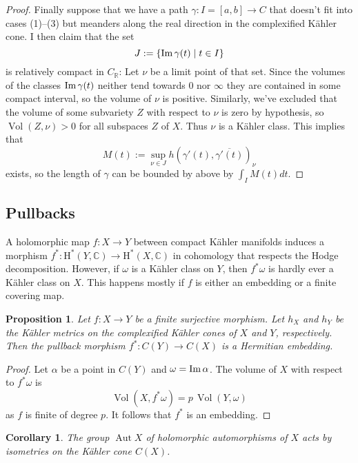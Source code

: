 \documentclass[11pt,a4paper]{amsart}
\newtheorem{prop}[theo]{Proposition}
\newtheorem{coro}[theo]{Corollary}
\theoremstyle{definition}
\theoremstyle{remark}
\newcommand{\RR}{\mathbb{R}}
\newcommand{\CC}{\mathbb{C}}
\newcommand{\Aut}{\mathop{\mathrm{Aut}}}
\newcommand{\Vol}{\mathop{\mathrm{Vol}}}
\def\Im{\mathop{\rm Im}}
\def\ov#1{\overline{#1}}
\def\coho#1{\mathrm{H}^{#1}}
\def\kf{\omega}
\def\ckf{\alpha}
\def\KC{C}
\begin{document}
\begin{proof}
Finally suppose that we have a path $\gamma : I = [a,b] \to C$ that
doesn't fit into cases (1)--(3) but meanders along the real direction in
the complexified K\"{a}hler cone. I then claim that the set
$$
J := \{ \Im \gamma(t) \mid t \in I \}
$$
is relatively compact in $C_{\RR}$: Let $\nu$ be a limit point of that
set. Since the volumes of the classes $\Im \gamma(t)$ neither tend
towards $0$ nor $\infty$ they are contained in some compact interval, so
the volume of $\nu$ is positive. Similarly, we've excluded that the
volume of some subvariety $Z$ with respect to $\nu$ is zero by
hypothesis, so $\Vol(Z,\nu) > 0$ for all subspaces $Z$ of $X$. Thus
$\nu$ is a K\"{a}hler class. 
This implies that
$$
M(t) := \sup_{\nu \in J} h(\gamma'(t),\ov{\gamma'(t)})_{\nu}
$$
exists, so the length of $\gamma$ can be bounded by above by
$\int_I M(t) dt$.
\end{proof}

\subsection{Pullbacks}

A holomorphic map $f : X \to Y$ between compact K\"{a}hler manifolds induces
a morphism $f^* : \coho{*}(Y,\CC) \to \coho{*}(X,\CC)$ in cohomology
that respects the Hodge decomposition. However, if $\kf$ is a K\"{a}hler
class on $Y$, then $f^*\kf$ is hardly ever a K\"{a}hler class on $X$. This
happens mostly if $f$ is either an embedding or a finite covering map.

\begin{prop}
Let $f : X \to Y$ be a finite surjective morphism. Let $h_X$ and $h_Y$
be the K\"{a}hler metrics on the complexified K\"{a}hler cones of $X$ and
$Y$, respectively. Then the pullback morphism $f^* : \KC(Y) \to \KC(X)$
is a Hermitian embedding.
\end{prop}

\begin{proof}
Let $\ckf$ be a point in $\KC(Y)$ and $\kf = \Im \ckf$. The volume of
$X$ with respect to $f^*\kf$ is
\begin{equation*}
  \Vol(X,f^*\kf) = p \, \Vol(Y,\kf)
\end{equation*}
as $f$ is finite of degree $p$. It follows that $f^*$ is an embedding.
\end{proof}

\begin{coro}
The group $\Aut X$ of holomorphic automorphisms of $X$ acts by
isometries on the K\"{a}hler cone $\KC(X)$.
\end{coro}
\end{document}

